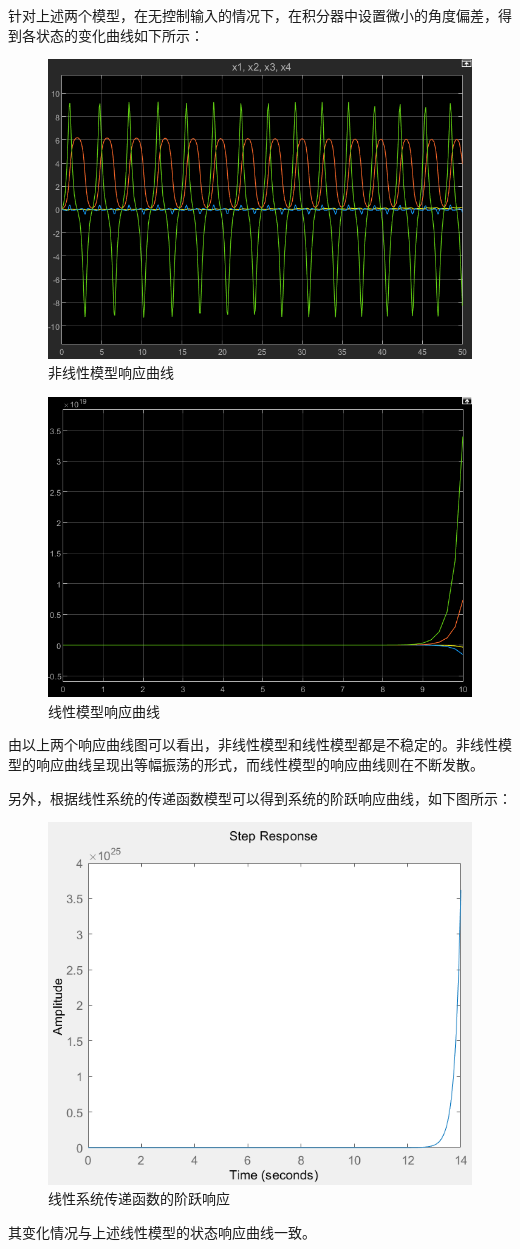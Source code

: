 \documentclass[UTF8]{article}
\begin{document}
针对上述两个模型，在无控制输入的情况下，在积分器中设置微小的角度偏差，得到各状态的变化曲线如下所示：
\begin{figure}[H]
    \centering %
    \includegraphics[width=.6\textwidth]{figure/倒立摆-非线性模型-开环响应.png} 
    \caption{非线性模型响应曲线} %
\end{figure}
\begin{figure}[H]
    \centering %
    \includegraphics[width=.6\textwidth]{figure/倒立摆-线性模型-开环响应.png} 
    \caption{线性模型响应曲线} %
\end{figure}
由以上两个响应曲线图可以看出，非线性模型和线性模型都是不稳定的。非线性模型的响应曲线呈现出等幅振荡的形式，而线性模型的响应曲线则在不断发散。

另外，根据线性系统的传递函数模型可以得到系统的阶跃响应曲线，如下图所示：
\begin{figure}[H]
    \centering %
    \includegraphics[width=.6\textwidth]{figure/倒立摆-传函-阶跃响应.png} 
    \caption{线性系统传递函数的阶跃响应} %
\end{figure}
其变化情况与上述线性模型的状态响应曲线一致。
\end{document}
